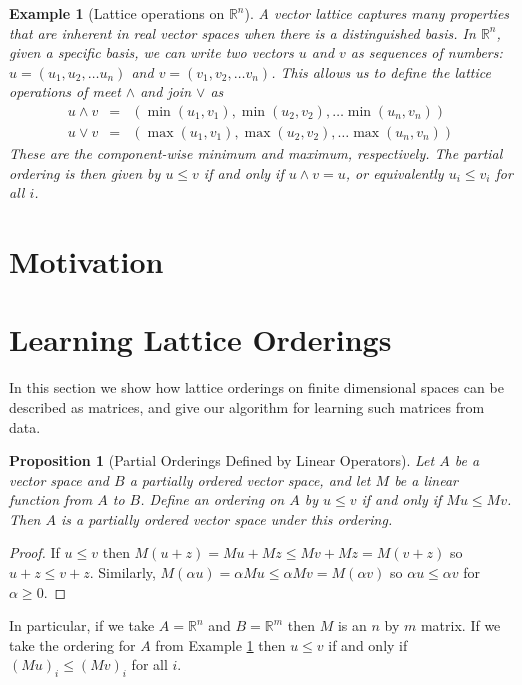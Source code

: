 \documentclass{article}
\newtheorem{proposition}{Proposition}
\newtheorem{example}{Example}
\newcommand{\R}{\mathbb{R}}
\begin{document}
\begin{example}[Lattice operations on $\R^n$]
  \label{example:finite}
  A vector lattice captures many properties that are inherent in real
  vector spaces when there is a \emph{distinguished basis}. In $\R^n$,
  given a specific basis, we can write two vectors $u$ and $v$ as
  sequences of numbers: $u = (u_1,u_2,\ldots u_n)$ and $v =
  (v_1,v_2,\ldots v_n)$. This allows us to define the lattice
  operations of meet $\land$ and join $\lor$ as
\begin{eqnarray*}
u\land v &=& (\min(u_1,v_1),\min(u_2,v_2),\ldots \min(u_n,v_n))\\
u\lor v &=& (\max(u_1,v_1),\max(u_2,v_2),\ldots \max(u_n,v_n))
\end{eqnarray*}
These are the component-wise minimum and maximum, respectively. The partial
ordering is then given by $u \le v$ if and only if $u \land v = u$, or
equivalently $u_i \le v_i$ for all $i$.
\end{example}

\section{Motivation}



\section{Learning Lattice Orderings}

In this section we show how lattice orderings on finite dimensional
spaces can be described as matrices, and give our algorithm for
learning such matrices from data.

\begin{proposition}[Partial Orderings Defined by Linear Operators]
  Let $A$ be a vector space and $B$ a partially ordered vector space,
  and let $M$ be a linear function from $A$ to $B$. Define an ordering
  on $A$ by $u\le v$ if and only if $Mu \le Mv$. Then $A$ is a
  partially ordered vector space under this ordering.
\end{proposition}

\begin{proof}
If $u \le v$ then $M(u + z) = Mu + Mz \le Mv + Mz = M(v +
z)$ so $u + z \le v + z$. Similarly, $M(\alpha u) = \alpha Mu
\le\alpha Mv = M(\alpha v)$ so $\alpha u \le \alpha v$ for
$\alpha \ge 0$.
\end{proof}

In particular, if we take $A = \R^n$ and $B = \R^m$ then $M$ is an $n$
by $m$ matrix. If we take the ordering for $A$ from Example
\ref{example:finite} then $u\le v$ if and only if $(Mu)_i \le (Mv)_i$
for all $i$.
\end{document}
